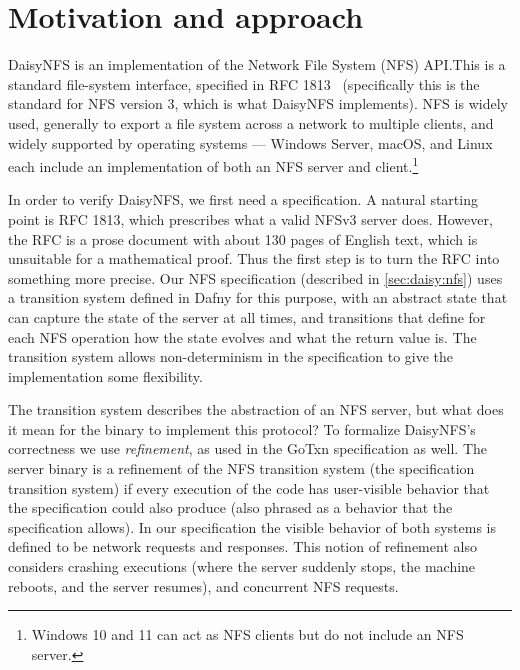 \section{Motivation and approach}%
\label{sec:daisy:motivation}

DaisyNFS is an implementation of the Network File System (NFS) API.\@ This is a
standard file-system interface, specified in RFC 1813~\cite{RFC:1813}
(specifically this is the standard for NFS version 3, which is what DaisyNFS
implements). NFS is widely used, generally to export a file system across a
network to multiple clients, and widely supported by operating systems ---
Windows Server, macOS, and Linux each include an implementation of both an NFS
server and client.\footnote{Windows 10 and 11 can act as NFS clients but do not
include an NFS server.}

In order to verify DaisyNFS, we first need a specification. A natural starting
point is RFC 1813, which prescribes what a valid NFSv3 server
does. However, the RFC is a prose document with about 130 pages of English text,
which is unsuitable for a mathematical proof. Thus the first step is
to turn the RFC into something more precise. Our NFS specification (described in
\cref{sec:daisy:nfs}) uses a
transition system defined in Dafny for this purpose, with an abstract state that
can capture the state of the server at all times, and transitions that define
for each NFS operation how the state evolves and what the return value is. The
transition system allows non-determinism in the specification to give the
implementation some flexibility.

The transition system describes the abstraction of an NFS server, but what does
it mean for the  binary to implement this protocol? To formalize
DaisyNFS's correctness we use \emph{refinement}, as used in the GoTxn
specification as well. The server binary is a refinement of the NFS transition
system (the specification transition system) if every execution of the code has
user-visible behavior that the specification could also produce (also phrased as
a behavior that the specification allows). In our specification the visible
behavior of both systems is defined to be network requests and responses. This
notion of refinement also considers crashing executions (where the server
suddenly stops, the machine reboots, and the server resumes), and concurrent NFS
requests.


